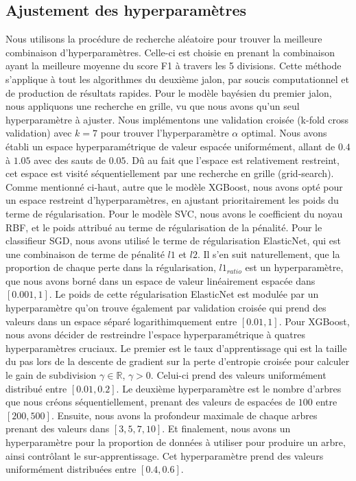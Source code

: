 \documentclass{article}
\begin{document}
\subsection{Ajustement des hyperparamètres}
Nous utilisons la procédure de recherche aléatoire pour trouver la meilleure combinaison d'hyperparamètres. Celle-ci est choisie en prenant la combinaison ayant la meilleure moyenne du score F1 à travers les 5 divisions. Cette méthode s'applique à tout les algorithmes du deuxième jalon, par soucis computationnel et de production de résultats rapides. Pour le modèle bayésien du premier jalon, nous appliquons une recherche en grille, vu que nous avons qu'un seul hyperparamètre à ajuster. Nous implémentons une validation croisée (k-fold cross validation) avec $k = 7$ pour trouver l'hyperparamètre $\alpha$ optimal. Nous avons établi un espace hyperparamétrique de valeur espacée uniformément, allant de $0.4$ à $1.05$ avec des sauts de $0.05$. Dû au fait que l'espace est relativement restreint, cet espace est visité séquentiellement par une recherche en grille (grid-search). Comme mentionné ci-haut, autre que le modèle XGBoost, nous avons opté pour un espace restreint d'hyperparamètres, en ajustant prioritairement les poids du terme de régularisation. 
 Pour le modèle SVC, nous avons le coefficient du noyau RBF, et le poids attribué au terme de régularisation de la pénalité. Pour le classifieur SGD, nous avons utilisé le terme de régularisation ElasticNet, qui est une combinaison de terme de pénalité $l1$ et $l2$. Il s'en suit naturellement, que la proportion de chaque perte dans la régularisation, $l1_{ratio}$ est un hyperparamètre, que nous avons borné dans un espace de valeur linéairement espacée dans $[0.001, 1]$. Le poids de cette régularisation ElasticNet est modulée par un hyperparamètre qu'on trouve également par validation croisée qui prend des valeurs dans un espace séparé logarithimquement entre $[0.01, 1]$. Pour XGBoost, nous avons décider de restreindre l'espace hyperparamétrique à quatres hyperparamètres cruciaux. Le premier est le taux d'apprentissage qui est la taille du pas lors de la descente de gradient sur la perte d'entropie croisée pour calculer le gain de subdivision $\gamma \in \mathbb{R}$, $\gamma > 0$. Celui-ci prend des valeurs uniformément distribué entre $[0.01, 0.2]$. Le deuxième hyperparamètre est le nombre d'arbres que nous créons séquentiellement, prenant des valeurs de espacées de $100$ entre $[200, 500]$. Ensuite, nous avons la profondeur maximale de chaque arbres prenant des valeurs dans $[3, 5, 7, 10]$. Et finalement, nous avons un hyperparamètre pour la proportion de données à utiliser pour produire un arbre, ainsi contrôlant le sur-apprentissage. Cet hyperparamètre prend des valeurs uniformément distribuées entre $[0.4, 0.6]$.
\end{document}
